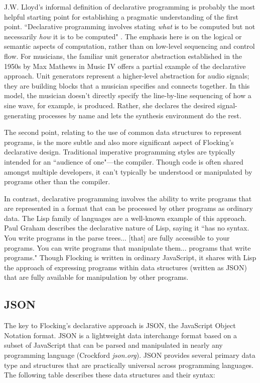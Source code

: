 \documentclass{article}
\begin{document}
J.W. Lloyd's informal definition of declarative programming is probably the most helpful starting point for establishing a pragmatic understanding of the first point. ``Declarative programming involves stating {\it what} is to be computed but not necessarily {\it how} it is to be computed" \cite{lloyd1994practical}. The emphasis here is on the logical or semantic aspects of computation, rather than on low-level sequencing and control flow. For musicians, the familiar unit generator abstraction established in the 1950s by Max Mathews in Music IV \cite{mathews1969technology} offers a partial example of the declarative approach. Unit generators represent a higher-level abstraction for audio signals; they are building blocks that a musician specifies and connects together. In this model, the musician doesn't directly specify the line-by-line sequencing of how a sine wave, for example, is produced. Rather, she declares the desired signal-generating processes by name and lets the synthesis environment do the rest.

The second point, relating to the use of common data structures to represent programs, is the more subtle and also more significant aspect of Flocking’s declarative design. Traditional imperative programming styles are typically intended for an ``audience of one"---the compiler. Though code is often shared amongst multiple developers, it can’t typically be understood or manipulated by programs other than the compiler.

In contrast, declarative programming involves the ability to write programs that are represented in a format that can be processed by other programs as ordinary data. The Lisp family of languages are a well-known example of this approach. Paul Graham describes the declarative nature of Lisp, saying it ``has no syntax. You write programs in the parse trees... [that] are fully accessible to your programs. You can write programs that manipulate them... programs that write programs." Though Flocking is written in ordinary JavaScript, it shares with Lisp the approach of expressing programs within data structures (written as JSON) that are fully available for manipulation by other programs.

\subsection{JSON}

The key to Flocking's declarative approach is JSON, the JavaScript Object Notation format. JSON is a lightweight data interchange format based on a subset of JavaScript that can be parsed and manipulated in nearly any programming language (Crockford {\it json.org}). JSON provides several primary data type and structures that are practically universal across programming languages. The following table describes these data structures and their syntax:
\end{document}
